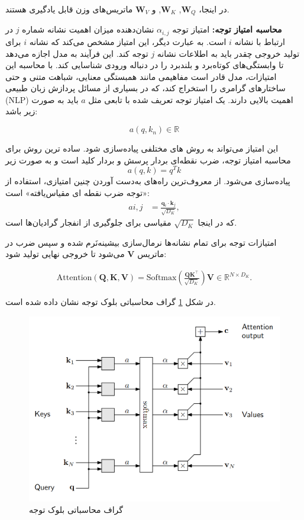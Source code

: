 در اینجا، $\mathbf{W}_Q$, $\mathbf{W}_K$, و $\mathbf{W}_V$ ماتریس‌های وزن قابل یادگیری هستند.

\textbf{محاسبه امتیاز توجه:} 
امتیاز توجه $\alpha_{i,j}$ نشان‌دهنده میزان اهمیت  نشانه%
شماره $j$ در ارتباط با نشانه $i$ است. به عبارت دیگر، این امتیاز مشخص می‌کند که نشانه $i$ برای تولید خروجی چقدر باید به اطلاعات نشانه $j$ توجه کند. این فرآیند به مدل اجازه می‌دهد تا وابستگی‌های کوتاه‌برد و بلند‌برد را در دنباله ورودی شناسایی کند. با محاسبه این امتیازات، مدل قادر است مفاهیمی مانند همبستگی معنایی، شباهت متنی و حتی ساختارهای گرامری را استخراج کند، که در بسیاری از مسائل پردازش زبان طبیعی (NLP) اهمیت بالایی دارند. یک امتیاز توجه تعریف شده با تابعی مثل $a$ باید به صورت زیر باشد:

$$
a(q,k_n) \in \mathbb{R}
$$

این امتیاز می‌تواند به روش های مختلفی پیاده‌سازی شود. ساده ترین روش برای محاسبه امتیاز توجه، ضرب نقطه‌ای بردار پرسش و بردار کلید است و  به صورت زیر
$$
a(q,k) = q^{T}k
$$
پیاده‌سازی می‌شود. از معروف‌ترین راه‌های به‌دست آوردن چنین امتیازی، استفاده از «توجه ضرب نقطه ای مقیاس‌یافته»%
است:
\begin{align*} 
	a{i,j} &= \frac{\mathbf{q}_i \cdot \mathbf{k}_j}{\sqrt{D_K}},
\end{align*}
که در اینجا $\sqrt{D_K}$ مقیاسی برای جلوگیری از انفجار گرادیان‌ها است.

امتیازات توجه برای تمام نشانه‌ها نرمال‌سازی بیشینه‌نَرم%
شده و سپس ضرب در ماتریس $\mathbf{V}$ می‌شود تا خروجی نهایی تولید شود:


\begin{align}
	\text{Attention}(\mathbf{Q}, \mathbf{K}, \mathbf{V}) = \text{Softmax}\left(\frac{\mathbf{Q} \mathbf{K}^\top}{\sqrt{D_K}}\right) \mathbf{V} \in \mathbb{R}^{N \times D_K}.
\end{align}

در شکل \ref{fig:attncompgraph} گراف محاسباتی بلوک توجه نشان داده شده است.

\begin{figure}
	\centering
	\includegraphics[width=0.7\linewidth]{figs/attnCompGraph}
	\caption{گراف محاسباتی بلوک توجه}
	\label{fig:attncompgraph}
\end{figure}


